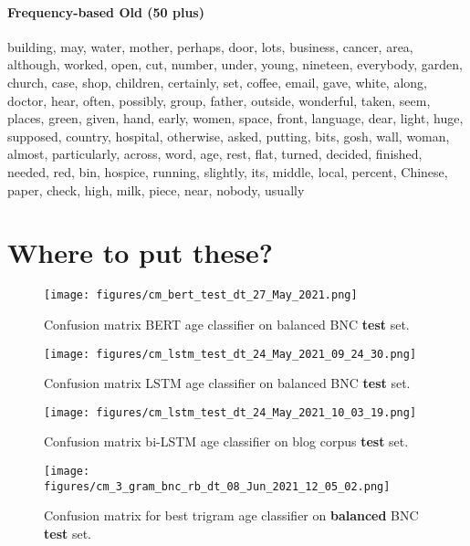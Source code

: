 \paragraph{Frequency-based Old (50 plus)} building, may, water, mother, perhaps, door, lots, business, cancer, area, although, worked, open, cut, number, under, young, nineteen, everybody, garden, church, case, shop, children, certainly, set, coffee, email, gave, white, along, doctor, hear, often, possibly, group, father, outside, wonderful, taken, seem, places, green, given, hand, early, women, space, front, language, dear, light, huge, supposed, country, hospital, otherwise, asked, putting, bits, gosh, wall, woman, almost, particularly, across, word, age, rest, flat, turned, decided, finished, needed, red, bin, hospice, running, slightly, its, middle, local, percent, Chinese, paper, check, high, milk, piece, near, nobody, usually

\section{Where to put these?}

\begin{figure}[H]
    \centering
    \texttt{[image: figures/cm\_bert\_test\_dt\_27\_May\_2021.png]}
    \caption{Confusion matrix BERT age classifier on balanced BNC \textbf{test} set.}
    \label{fig:cm_bert_bnc_rb}
\end{figure}

\begin{figure}[H]
    \centering
    \texttt{[image: figures/cm\_lstm\_test\_dt\_24\_May\_2021\_09\_24\_30.png]}
    \caption{Confusion matrix LSTM age classifier on balanced BNC \textbf{test} set.}
    \label{fig:cm_lstm_bnc_rb}
\end{figure}

\begin{figure}[H]
    \centering
    \texttt{[image: figures/cm\_lstm\_test\_dt\_24\_May\_2021\_10\_03\_19.png]}
    \caption{Confusion matrix bi-LSTM age classifier on blog corpus \textbf{test} set.}
    \label{fig:cm_lstm_blog}
\end{figure}

\begin{figure}[H]
    \centering
    \texttt{[image: figures/cm\_3\_gram\_bnc\_rb\_dt\_08\_Jun\_2021\_12\_05\_02.png]}
    \caption{Confusion matrix for best trigram age classifier on \textbf{balanced} BNC \textbf{test} set.}
    \label{fig:cm_trigram_bnc_rb}
\end{figure}

